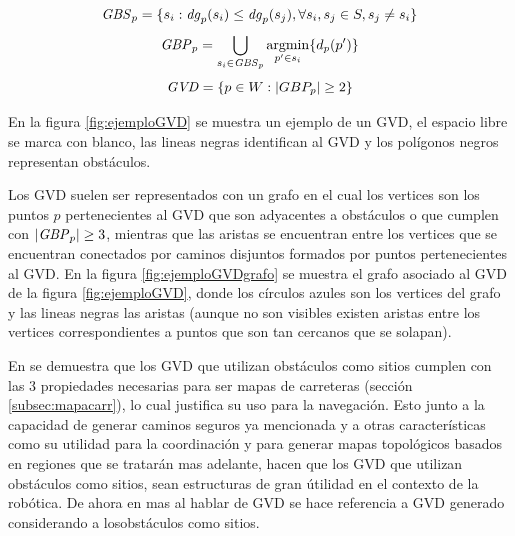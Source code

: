 \begin{equation}
  \mathit{GBS}_p = \{s_i : \mathit{dg}_p(s_i) \leq \mathit{dg}_p(s_j), \forall s_i,s_j\in S,s_j \neq s_i\}\label{eq:GBS}
\end{equation}
\begin{equation}
  \mathit{GBP}_p =\bigcup_{s_i \in \mathit{GBS}_p} \operatorname*{argmin}_{p'\in s_i}\{d_p(p')\}\label{eq:GBP}
\end{equation}
\begin{equation}
  \mathit{GVD}  = \{p \in W : |GBP_p| \geq 2\}\label{eq:GVD}
\end{equation}

En la figura \ref{fig:ejemploGVD} se muestra un ejemplo de un GVD, el espacio libre se marca con blanco, las lineas negras identifican al GVD y los polígonos negros representan obstáculos. 

Los GVD suelen ser representados con un grafo en el cual los vertices son los puntos $p$ pertenecientes al GVD que son adyacentes a obstáculos o que cumplen con $|\mathit{GBP}_p|\geq 3$, mientras que las aristas se encuentran entre los vertices que se encuentran conectados por caminos disjuntos formados por puntos pertenecientes al GVD. En la figura \ref{fig:ejemploGVDgrafo} se muestra el grafo asociado al GVD de la figura \ref{fig:ejemploGVD}, donde los círculos azules son los vertices del grafo y las lineas negras las aristas (aunque no son visibles existen aristas entre los vertices correspondientes a puntos que son tan cercanos que se solapan).

En \cite{choset2005principles} se demuestra que los GVD que utilizan obstáculos como sitios cumplen con las 3 propiedades necesarias para ser mapas de carreteras (sección \ref{subsec:mapacarr}), lo cual justifica su uso para la navegación. Esto junto a la capacidad de generar caminos seguros ya mencionada y a otras características como su utilidad para la coordinación y para generar mapas topológicos basados en regiones que se tratarán mas adelante, hacen que los GVD que utilizan obstáculos como sitios, sean estructuras de gran útilidad en el contexto de la robótica. De ahora en mas al hablar de GVD se hace referencia a GVD generado considerando a losobstáculos como sitios.

